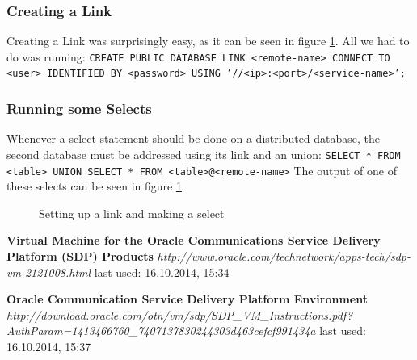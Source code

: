 \documentclass[12pt]{article}
\begin{document}
\subsubsection{Creating a Link}
Creating a Link was surprisingly easy, as it can be seen in figure \ref{fig:endres}.
All we had to do was running:
\todo{}
\texttt{CREATE PUBLIC DATABASE LINK <remote-name> CONNECT TO <user> IDENTIFIED BY <password> USING '//<ip>:<port>/<service-name>';}
\subsubsection{Running some Selects}
Whenever a select statement should be done on a distributed database, the second database must be addressed using its link and an union:
\texttt{SELECT * FROM <table> UNION SELECT * FROM <table>@<remote-name>}
The output of one of these selects can be seen in figure \ref{fig:endres}

 \begin{figure}[here!]
	\centering
	\caption{Setting up a link and making a select}
	\label{fig:endres}
	\end{figure}	
	
\newpage
\printglossaries
\listoffigures
\newpage
\begin{thebibliography}{56}

   \textbf{Virtual Machine for the Oracle Communications Service 
Delivery Platform (SDP) Products}\newline
  \emph{http://www.oracle.com/technetwork/apps-tech/sdp-vm-2121008.html}
  \newline last used: 16.10.2014, 15:34


   \textbf{Oracle Communication 
Service Delivery Platform 
Environment}\newline
  \emph{http://download.oracle.com/otn/vm/sdp/SDP\_VM\_Instructions.pdf?AuthParam=1413466760\_7407137830244303d463cefcf991434a}
  \newline last used: 16.10.2014, 15:37




\end{thebibliography}
\end{document}
